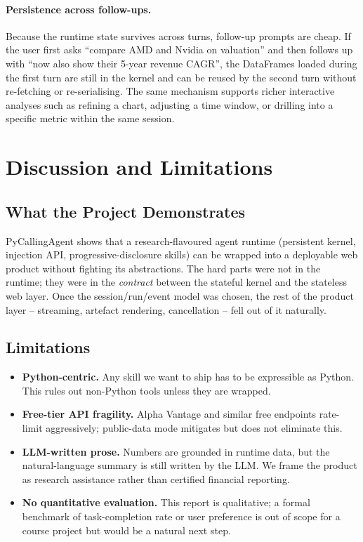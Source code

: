\documentclass[11pt,a4paper]{article}
\begin{document}
\paragraph{Persistence across follow-ups.}
Because the runtime state survives across turns, follow-up prompts are cheap. If the user first asks ``compare AMD and Nvidia on valuation'' and then follows up with ``now also show their 5-year revenue CAGR'', the DataFrames loaded during the first turn are still in the kernel and can be reused by the second turn without re-fetching or re-serialising. The same mechanism supports richer interactive analyses such as refining a chart, adjusting a time window, or drilling into a specific metric within the same session.

\section{Discussion and Limitations}

\subsection{What the Project Demonstrates}

PyCallingAgent shows that a research-flavoured agent runtime (persistent kernel, injection API, progressive-disclosure skills) can be wrapped into a deployable web product without fighting its abstractions. The hard parts were not in the runtime; they were in the \emph{contract} between the stateful kernel and the stateless web layer. Once the session/run/event model was chosen, the rest of the product layer -- streaming, artefact rendering, cancellation -- fell out of it naturally.

\subsection{Limitations}

\begin{itemize}[leftmargin=1.3em,itemsep=0.2em]
    \item \textbf{Python-centric.} Any skill we want to ship has to be expressible as Python. This rules out non-Python tools unless they are wrapped.
    \item \textbf{Free-tier API fragility.} Alpha Vantage and similar free endpoints rate-limit aggressively; public-data mode mitigates but does not eliminate this.
    \item \textbf{LLM-written prose.} Numbers are grounded in runtime data, but the natural-language summary is still written by the LLM. We frame the product as research assistance rather than certified financial reporting.
    \item \textbf{No quantitative evaluation.} This report is qualitative; a formal benchmark of task-completion rate or user preference is out of scope for a course project but would be a natural next step.
\end{itemize}
\end{document}
